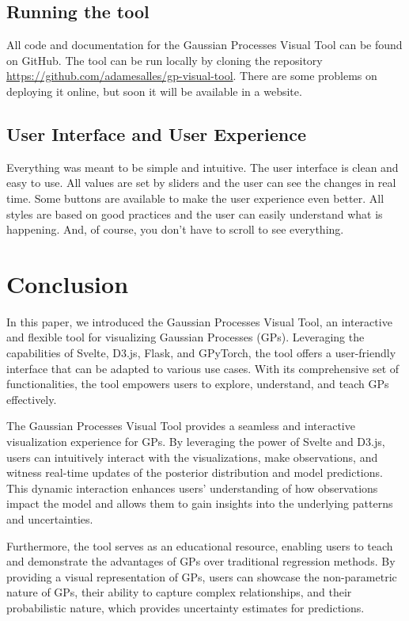 \documentclass[preprint,journal]{vgtc}       %
\begin{document}
\subsection{Running the tool}

All code and documentation for the Gaussian Processes Visual Tool can be found on GitHub. The tool can be run locally by cloning the repository \url{https://github.com/adamesalles/gp-visual-tool}. There are some problems on deploying it online, but soon it will be available in a website.

\subsection{User Interface and User Experience}

Everything was meant to be simple and intuitive. The user interface is clean and easy to use. All values are set by sliders and the user can see the changes in real time. Some buttons are available to make the user experience even better. All styles are based on good practices and the user can easily understand what is happening. And, of course, you don't have to scroll to see everything.

\section{Conclusion}
In this paper, we introduced the Gaussian Processes Visual Tool, an interactive and flexible tool for visualizing Gaussian Processes (GPs). Leveraging the capabilities of Svelte, D3.js, Flask, and GPyTorch, the tool offers a user-friendly interface that can be adapted to various use cases. With its comprehensive set of functionalities, the tool empowers users to explore, understand, and teach GPs effectively.

The Gaussian Processes Visual Tool provides a seamless and interactive visualization experience for GPs. By leveraging the power of Svelte and D3.js, users can intuitively interact with the visualizations, make observations, and witness real-time updates of the posterior distribution and model predictions. This dynamic interaction enhances users' understanding of how observations impact the model and allows them to gain insights into the underlying patterns and uncertainties.

Furthermore, the tool serves as an educational resource, enabling users to teach and demonstrate the advantages of GPs over traditional regression methods. By providing a visual representation of GPs, users can showcase the non-parametric nature of GPs, their ability to capture complex relationships, and their probabilistic nature, which provides uncertainty estimates for predictions.
\end{document}
